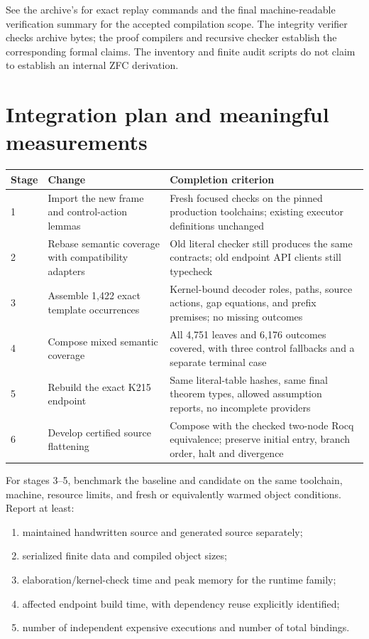 \documentclass[11pt,letterpaper]{article}
\theoremstyle{definition}
\newcommand{\code}[1]{\texttt{\detokenize{#1}}}
\begin{document}
See the archive's \code{README.md} for exact replay commands and the final
machine-readable verification summary for the accepted compilation scope.
The integrity verifier checks archive bytes; the proof compilers and recursive
checker establish the corresponding formal claims. The inventory and finite
audit scripts do not claim to establish an internal ZFC derivation.

\section{Integration plan and meaningful measurements}

\begin{longtable}{@{}p{}p{}p{}@{}}
\toprule
Stage & Change & Completion criterion\\
\midrule\endhead
1 & Import the new frame and control-action lemmas & Fresh focused checks on
the pinned production toolchains; existing executor definitions unchanged\\
2 & Rebase semantic coverage with compatibility adapters & Old literal checker
still produces the same contracts; old endpoint API clients still typecheck\\
3 & Assemble 1,422 exact template occurrences & Kernel-bound decoder roles,
paths, source actions, gap equations, and prefix premises; no missing outcomes\\
4 & Compose mixed semantic coverage & All 4,751 leaves and 6,176 outcomes
covered, with three control fallbacks and a separate terminal case\\
5 & Rebuild the exact K215 endpoint & Same literal-table hashes, same final
theorem types, allowed assumption reports, no incomplete providers\\
6 & Develop certified source flattening & Compose with the checked two-node
Rocq equivalence; preserve initial entry, branch order, halt and divergence\\
\bottomrule
\end{longtable}

For stages 3--5, benchmark the baseline and candidate on the same toolchain,
machine, resource limits, and fresh or equivalently warmed object conditions.
Report at least:
\begin{enumerate}
\item maintained handwritten source and generated source separately;
\item serialized finite data and compiled object sizes;
\item elaboration/kernel-check time and peak memory for the runtime family;
\item affected endpoint build time, with dependency reuse explicitly identified;
\item number of independent expensive executions and number of total bindings.
\end{enumerate}
\end{document}
